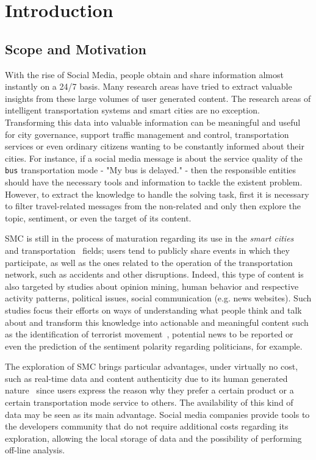 \chapter{Introduction} \label{chap:intro}

\minitoc \mtcskip \noindent

\section{Scope and Motivation}\label{sec:scope_motivation}
With the rise of Social Media, people obtain and share information almost instantly on a 24/7 basis. Many research areas have tried to extract valuable insights from these large volumes of user generated content. The research areas of intelligent transportation systems and smart cities are no exception. Transforming this data into valuable information can be meaningful and useful for city governance, support traffic management and control, transportation services or even ordinary citizens wanting to be constantly informed about their cities. For instance, if a social media message is about the service quality of the \texttt{bus} transportation mode - "My bus is delayed." - then the responsible entities should have the necessary tools and information to tackle the existent problem. However, to extract the knowledge to handle the solving task, first it is necessary to filter travel-related messages from the non-related and only then explore the topic, sentiment, or even the target of its content.

\gls{SMC} is still in the process of maturation regarding its use in the \textit{smart cities}~\cite{batty2012smart} and transportation~\cite{gal2014potential} fields; users tend to publicly share events in which they participate, as well as the ones related to the operation of the transportation network, such as accidents and other disruptions. Indeed, this type of content is also targeted by studies about opinion mining, human behavior and respective activity patterns, political issues, social communication (e.g. news websites). Such studies focus their efforts on ways of understanding what people think and talk about and transform this knowledge into actionable and meaningful content such as the identification of terrorist movement~\cite{zhang2016mining}, potential news to be reported or even the prediction of the sentiment polarity regarding politicians, for example.

The exploration of \gls{SMC} brings particular advantages, under virtually no cost, such as real-time data and content authenticity due to its human generated nature~\cite{kuflik2017automating} since users express the reason why they prefer a certain product or a certain transportation mode service to others. The availability of this kind of data may be seen as its main advantage. Social media companies provide tools to the developers community that do not require additional costs regarding its exploration, allowing the local storage of data and the possibility of performing off-line analysis.


